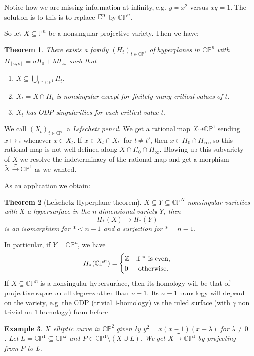 \documentclass[A4paper, british, reqno]{amsart}
\theoremstyle{darkgreentheorem}
\newtheorem{thm}{Theorem}[section]
\theoremstyle{darkbluedefinition}
\theoremstyle{darkredexample}
\newtheorem{exa}[thm]{Example}
\theoremstyle{remark}
\newcommand{\CP}{\mathbb{CP}}
\newcommand{\1}{\mathbbm{1}}
\begin{document}
Notice how we are missing information at infinity, e.g. $y=x^{2}$ versus $xy=1$.
The solution is to this is to replace $\mathbb{C}^{n}$ by $\CP^{n}$.

So let $X\subseteq\mathbb{P}^{n}$ be a nonsingular projective variety.
Then we have:

\begin{thm}
    There exists a family $(H_{t})_{t\in \CP^{1}}$ of hyperplanes in $\CP^{n}$ with $H_{[a,b]}=aH_{0}+bH_{\infty}$ such that
    \begin{enumerate}
	\item $X\subseteq \bigcup_{t\in \CP^{1}}H_{t}$.
	\item $X_{t}=X\cap H_{t}$ is nonsingular except for finitely many critical values of $t$.
	\item $X_{t}$ has ODP singularities for each critical value $t$.
    \end{enumerate}
\end{thm}

We call $(X_{t})_{t\in \CP^{1}}$ a \textit{Lefschetz pencil}.
We get a rational map $X\dashrightarrow \CP^{1}$ sending $x\mapsto t$ whenever $x\in X_{t}$.
If $x\in X_{t}\cap X_{t'}$ for $t\neq t'$, then $x\in H_{0}\cap H_{\infty}$, so this rational map is not well-defined along $X\cap H_{0}\cap H_{\infty}$.
Blowing-up this subvariety of $X$ we resolve the indeterminacy of the rational map and get a morphism $\tilde{X}\xrightarrow{\pi} \CP^{1}$ as we wanted.

As an application we obtain:

\begin{thm}[Lefschetz Hyperplane theorem]
    $X\subseteq Y\subseteq \CP^{N}$ nonsingular varieties with $X$ a hypersurface in the $n$-dimensional variety $Y$, then
    \[ H_{*}(X)\to H_{*}(Y) \]
    is an isomorphism for $*<n-1$ and a surjection for $*=n-1$.
\end{thm}

In particular, if $Y=\CP^{n}$, we have
\[ H_{*}(\CP^{n})=\begin{cases} \Z & \text{if } $*$ \text{ is even,} \\ 0 & \text{ otherwise.} \end{cases}\]
If $X\subseteq \CP^{n}$ is a nonsingular hypersurface, then its homology will be that of projective sapce on all degrees other than $n-1$.
Its $n-1$ homology will depend on the variety, e.g. the ODP (trivial $1$-homology) vs the ruled surface (with $\gamma$ non trivial on $1$-homology) from before.

\begin{exa}
    $X$ elliptic curve in $\CP^{2}$ given by $y^{2}=x(x-1)(x-\lambda)$ for $\lambda\neq 0$.
    Let $L=\CP^{1}\subseteq \CP^{2}$ and $P\in \CP^{1}\setminus (X\cup L)$.
    We get $X\xrightarrow{\pi}\CP^{1}$ by projecting from $P$ to $L$.
\end{exa}
\end{document}
